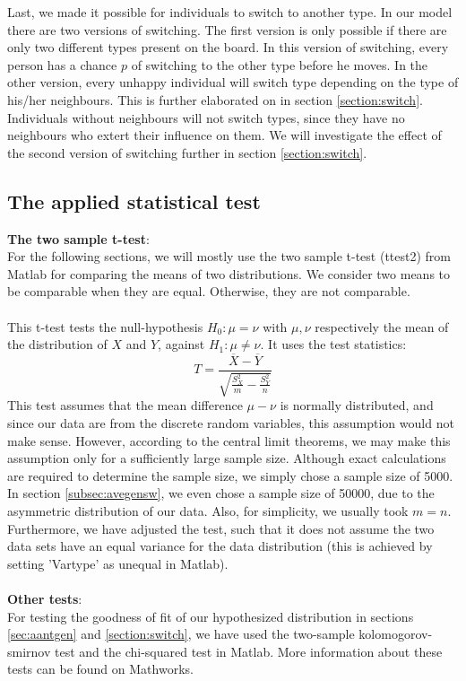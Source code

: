 Last, we made it possible for individuals to switch to another type.
In our model there are two versions of switching.
The first version is only possible if there are only two different types present on the board.
In this version of switching, every person has a chance $p$ of switching to the other type before he moves.
In the other version, every unhappy individual will switch type depending on the type of his/her neighbours.
This is further elaborated on in section \ref{section:switch}.
Individuals without neighbours will not switch types, since they have no neighbours who extert their influence on them.
We will investigate the effect of the second version of switching further in section \ref{section:switch}.
\subsection{The applied statistical test}
\textbf{The two sample t-test}:\\
For the following sections, we will mostly use the two sample t-test (ttest2) from Matlab for comparing the means of two distributions. We consider two means to be comparable when they are equal. Otherwise, they are not comparable.\\
\\
This t-test tests the null-hypothesis $H_0:\mu=\nu$ with $\mu,\nu$ respectively the mean of the distribution of $X$ and $Y$, against $H_1:\mu\neq\nu$. It uses the test statistics:
 \[T=\frac{\overline{X}-\overline{Y}}{\sqrt{\frac{S^2_X}{m}-\frac{S^2_Y}{n}}}\]
This test assumes that the mean difference $\mu-\nu$ is normally distributed, and since our data are from the discrete random variables, this assumption would not make sense. 
However, according to the central limit theorems, we may make this assumption only for a sufficiently large sample size. 
Although exact calculations are required to determine the sample size, we simply chose a sample size of 5000. In section \ref{subsec:avegensw}, we even chose a sample size of 50000, due to the asymmetric distribution of our data. Also, for simplicity, we usually took $m=n$. Furthermore, we have adjusted the test, such that it does not assume the two data sets have an equal variance for the data distribution (this is achieved by setting 'Vartype' as unequal in Matlab).\\
\\
\textbf{Other tests}:\\
For testing the goodness of fit of our hypothesized distribution in sections \ref{sec:aantgen} and \ref{section:switch}, we have used the two-sample kolomogorov-smirnov test and the chi-squared test in Matlab. More information about these tests can be found on Mathworks.  


